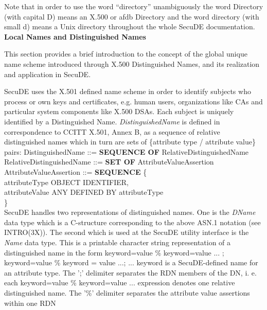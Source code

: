 Note that in order to use the word ``directory'' unambiguously the word
Directory (with capital D) means an X.500 or afdb Directory and the word
directory (with small d) means a Unix directory throughout the whole
SecuDE documentation. 
\\ [1em]
{\bf Local Names and Distinguished Names}

This section provides a brief introduction to the concept of the global
unique name scheme introduced through X.500 Distinguished Names,
and its realization and application in SecuDE.
  
SecuDE uses the X.501 defined name scheme in order to identify subjects who
process or own keys and certificates, e.g. human users, organizations like 
CAs and
particular system components like X.500 DSAs. Each subject is uniquely
identified by a Distinguished Name. 
{\em DistinguishedName} is defined in correspondence to CCITT X.501, Annex 
B, as
a sequence of relative distinguished names which in turn are sets
of \{attribute type / attribute value\} pairs:
{\small
\bvtab
DistinguishedName ::= \6 {\bf SEQUENCE OF} RelativeDistinguishedName                  
\\ [1ex]
RelativeDistinguishedName ::= \6 {\bf SET OF} AttributeValueAssertion                 
\\ [1ex]
AttributeValueAssertion ::= \6 {\bf SEQUENCE} \{                                      
\\
                               \7 attributeType \3 OBJECT IDENTIFIER,                 
\\
                               \7 attributeValue \3 ANY DEFINED BY 
attributeType      \\
                            \6 \} \\
\evtab                             
}
SecuDE handles two representations of distinguished names. One is the {\em 
DName}
data type which is a C-structure corresponding to the above ASN.1 notation 
(see INTRO(3X)). 
The second which is used at the SecuDE utility interface is the {\em Name} 
data type.
This is a printable character string representation
of a distinguished name in the form
\bc
{\small keyword=value \% keyword=value ... ; keyword=value \% keyword = 
value ...; ...}
\ec
keyword is a SecuDE-defined name for an attribute type. 
The ';' delimiter separates the RDN members of the DN, i. e. each 
keyword=value \% keyword=value ... expression denotes one relative 
distinguished name.
The '\%' delimiter separates the attribute value assertions within one RDN
